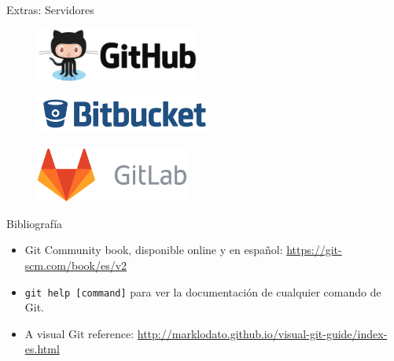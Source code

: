 \begin{frame}[t]{Extras: Servidores}

    \begin{figure}[ht]
        \begin{center}
            \includegraphics[height=0.7in]{images/github.png}
        \end{center}
    \end{figure}

    \begin{figure}[ht]
        \begin{center}
            \includegraphics[height=0.5in]{images/bitbucket.png}
        \end{center}
    \end{figure}

    \begin{figure}[ht]
        \begin{center}
            \includegraphics[height=0.7in]{images/gitlab.png}
        \end{center}
    \end{figure}

\end{frame}

\begin{frame}[t]{Bibliografía}

    \begin{itemize}
        \item Git Community book, disponible online y en español: \url{https://git-scm.com/book/es/v2}
        \item \texttt{git help [command]} para ver la documentación de cualquier comando de Git.
        \item A visual Git reference: \url{http://marklodato.github.io/visual-git-guide/index-es.html}
    \end{itemize}

\end{frame}

